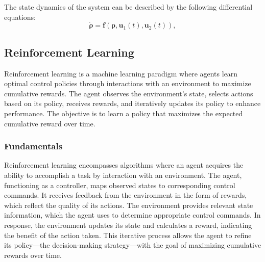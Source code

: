 \documentclass[conference]{IEEEtran}
\begin{document}
The state dynamics of the system can be described by the following differential equations:
\begin{equation}
	\dot{\boldsymbol{\rho}} = \boldsymbol{f}(\boldsymbol{\rho}, \boldsymbol{u}_1(t), \boldsymbol{u}_2(t)),
\end{equation}
\subsection{Reinforcement Learning}
Reinforcement learning is a machine learning paradigm where agents learn optimal control policies through interactions with an environment to maximize cumulative rewards. The agent observes the environment's state, selects actions based on its policy, receives rewards, and iteratively updates its policy to enhance performance. The objective is to learn a policy that maximizes the expected cumulative reward over time.

\subsubsection{Fundamentals}
Reinforcement learning encompasses algorithms where an agent acquires the ability to accomplish a task by interaction with an environment. The agent, functioning as a controller, maps observed states to corresponding control commands.
It receives feedback from the environment in the form of rewards, which reflect the quality of its actions. The environment provides relevant state information, which the agent uses to determine appropriate control commands. In response, the environment updates its state and calculates a reward, indicating the benefit of the action taken. This iterative process allows the agent to refine its policy—the decision-making strategy—with the goal of maximizing cumulative rewards over time.
\end{document}
